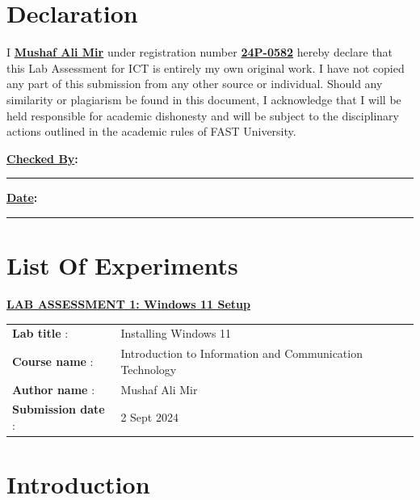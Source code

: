 \documentclass[a4paper,9pt]{article}
\begin{document}
	\newpage
	\section*{\LARGE Declaration}
{\Large	I \underline{\textbf{Mushaf Ali Mir}} under registration number \underline{\textbf{24P-0582}} hereby declare that this Lab Assessment for ICT is entirely my own original work. I have not copied any part of this submission from any other source or individual. Should any similarity or plagiarism be found in this document, I acknowledge that I will be held responsible for academic dishonesty and will be subject to the disciplinary actions outlined in the academic rules of FAST University.}

\vspace{17cm}
	
	\textbf{\underline{\Large Checked By}:} \rule{4cm}{0.7mm}
	\vspace{0.7cm}
	
	\textbf{\underline{\Large Date}:} \rule{4cm}{0.5mm}
	
	\newpage
	\section*{\LARGE List Of Experiments}
	
	\setcounter{tocdepth}{1}
	\tableofcontents
	
	\newpage
	\begin{center}
		 \hspace*{-1.2cm}
	{\Huge \bfseries \underline{ LAB ASSESSMENT 1: Windows 11 Setup} \par}
	\end{center}
	\noindent\begin{tabular}{@{}ll}
		\textbf{Lab title} :& Installing Windows 11\\
		\textbf{Course name} :&  Introduction to Information and Communication Technology\\
		\textbf{Author name} : & Mushaf Ali Mir\\
		\textbf{Submission date} :& 2 Sept 2024 \\
	\end{tabular}
	
	\section*{Introduction}
	\addtocounter{section}{1}
	
\end{document}
